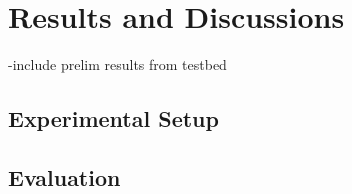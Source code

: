 \chapter{Results and Discussions}
\label{results}

-include prelim results from testbed

\section{Experimental Setup}

\section{Evaluation}